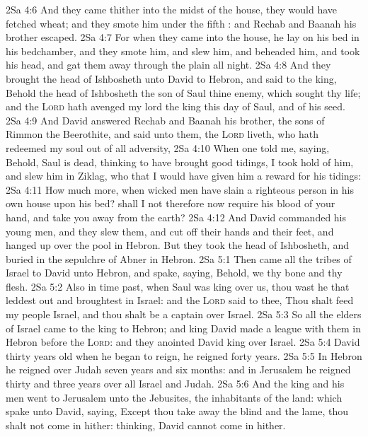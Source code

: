\vs 2Sa 4:6 And they came thither into the midst of the house,  they would have fetched wheat; and they smote him under the fifth : and Rechab and Baanah his brother escaped.
\vs 2Sa 4:7 For when they came into the house, he lay on his bed in his bedchamber, and they smote him, and slew him, and beheaded him, and took his head, and gat them away through the plain all night.
\vs 2Sa 4:8 And they brought the head of Ishbosheth unto David to Hebron, and said to the king, Behold the head of Ishbosheth the son of Saul thine enemy, which sought thy life; and the \textsc{Lord} hath avenged my lord the king this day of Saul, and of his seed.
\vs 2Sa 4:9 And David answered Rechab and Baanah his brother, the sons of Rimmon the Beerothite, and said unto them,  the \textsc{Lord} liveth, who hath redeemed my soul out of all adversity,
\vs 2Sa 4:10 When one told me, saying, Behold, Saul is dead, thinking to have brought good tidings, I took hold of him, and slew him in Ziklag, who  that I would have given him a reward for his tidings:
\vs 2Sa 4:11 How much more, when wicked men have slain a righteous person in his own house upon his bed? shall I not therefore now require his blood of your hand, and take you away from the earth?
\vs 2Sa 4:12 And David commanded his young men, and they slew them, and cut off their hands and their feet, and hanged  up over the pool in Hebron. But they took the head of Ishbosheth, and buried  in the sepulchre of Abner in Hebron.
\vs 2Sa 5:1 Then came all the tribes of Israel to David unto Hebron, and spake, saying, Behold, we  thy bone and thy flesh.
\vs 2Sa 5:2 Also in time past, when Saul was king over us, thou wast he that leddest out and broughtest in Israel: and the \textsc{Lord} said to thee, Thou shalt feed my people Israel, and thou shalt be a captain over Israel.
\vs 2Sa 5:3 So all the elders of Israel came to the king to Hebron; and king David made a league with them in Hebron before the \textsc{Lord}: and they anointed David king over Israel.
\vs 2Sa 5:4 David  thirty years old when he began to reign,  he reigned forty years.
\vs 2Sa 5:5 In Hebron he reigned over Judah seven years and six months: and in Jerusalem he reigned thirty and three years over all Israel and Judah.
\vs 2Sa 5:6 And the king and his men went to Jerusalem unto the Jebusites, the inhabitants of the land: which spake unto David, saying, Except thou take away the blind and the lame, thou shalt not come in hither: thinking, David cannot come in hither.
